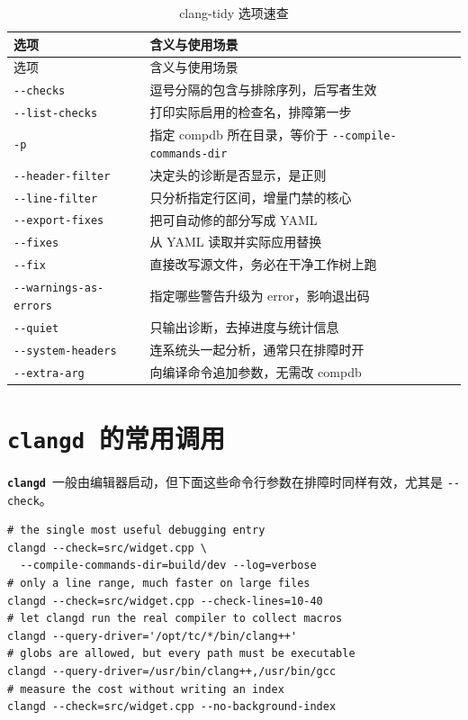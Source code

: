 \documentclass[12pt,a4paper,fontset=fandol]{ctexbook}
\newcommand{\Opt}[1]{\texttt{-\/-#1}}
\newcommand{\Lib}[1]{\textbf{\texttt{#1}}}
\newcommand{\CD}{\Lib{clangd}}
\begin{document}
{\footnotesize
\begin{longtable}{@{}>{\raggedright\arraybackslash}p{}
                  >{\raggedright\arraybackslash}p{}@{}}
\caption{clang-tidy 选项速查}\label{tab:appB-tidy}\\
\toprule
选项 & 含义与使用场景 \\
\midrule
\endfirsthead
\toprule
选项 & 含义与使用场景 \\
\midrule
\endhead
\bottomrule
\endlastfoot
\Opt{checks} & 逗号分隔的包含与排除序列，后写者生效 \\
\Opt{list-checks} & 打印实际启用的检查名，排障第一步 \\
\texttt{-p} & 指定 compdb 所在目录，等价于 \Opt{compile-commands-dir} \\
\Opt{header-filter} & 决定头的诊断是否显示，是正则 \\
\Opt{line-filter} & 只分析指定行区间，增量门禁的核心 \\
\Opt{export-fixes} & 把可自动修的部分写成 YAML \\
\Opt{fixes} & 从 YAML 读取并实际应用替换 \\
\Opt{fix} & 直接改写源文件，务必在干净工作树上跑 \\
\Opt{warnings-as-errors} & 指定哪些警告升级为 error，影响退出码 \\
\Opt{quiet} & 只输出诊断，去掉进度与统计信息 \\
\Opt{system-headers} & 连系统头一起分析，通常只在排障时开 \\
\Opt{extra-arg} & 向编译命令追加参数，无需改 compdb \\
\end{longtable}
}

\section{\CD\ 的常用调用}\label{sec:appB-s3}

\CD\ 一般由编辑器启动，但下面这些命令行参数在排障时同样有效，尤其是 \Opt{check}。

\begin{lstlisting}[style=shellstyle,caption={clangd 的命令行排障用法}]
# the single most useful debugging entry
clangd --check=src/widget.cpp \
  --compile-commands-dir=build/dev --log=verbose
# only a line range, much faster on large files
clangd --check=src/widget.cpp --check-lines=10-40
# let clangd run the real compiler to collect macros
clangd --query-driver='/opt/tc/*/bin/clang++'
# globs are allowed, but every path must be executable
clangd --query-driver=/usr/bin/clang++,/usr/bin/gcc
# measure the cost without writing an index
clangd --check=src/widget.cpp --no-background-index
\end{lstlisting}
\end{document}
